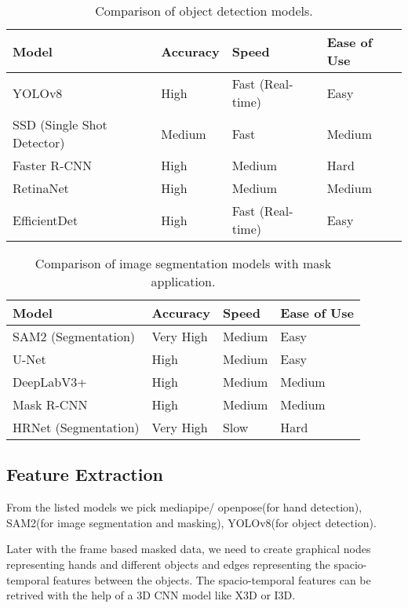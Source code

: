 \documentclass[conference]{IEEEtran}
\begin{document}
\begin{table}[h!]
    \centering
    \begin{tabular}{|l|l|l|l|}
    \hline
    \textbf{Model} & \textbf{Accuracy} & \textbf{Speed} & \textbf{Ease of Use} \\ \hline
    YOLOv8 & High & Fast (Real-time) & Easy \\ \hline
    SSD (Single Shot Detector) & Medium & Fast & Medium \\ \hline
    Faster R-CNN & High & Medium & Hard  \\ \hline
    RetinaNet & High & Medium & Medium \\ \hline
    EfficientDet & High & Fast (Real-time) & Easy\\ \hline
    \end{tabular}
    \caption{Comparison of object detection models.}
\end{table}

\begin{table}[h!]
    \centering
    \begin{tabular}{|l|l|l|l|}
    \hline
    \textbf{Model} & \textbf{Accuracy} & \textbf{Speed} & \textbf{Ease of Use} \\ \hline
    SAM2 (Segmentation) & Very High & Medium & Easy \\ \hline
    U-Net & High & Medium & Easy \\ \hline
    DeepLabV3+ & High & Medium & Medium  \\ \hline
    Mask R-CNN & High & Medium & Medium \\ \hline
    HRNet (Segmentation) & Very High & Slow & Hard \\ \hline
    \end{tabular}
    \caption{Comparison of image segmentation models with mask application.}
\end{table}

\subsection{Feature Extraction}
From the listed models we pick mediapipe/ openpose(for hand detection), SAM2(for image segmentation and masking), YOLOv8(for object detection).

Later with the frame based masked data, we need to create graphical nodes representing hands and different objects and edges representing the spacio-temporal features between the objects. The spacio-temporal features can be retrived with the help of a 3D CNN model like X3D or I3D.
\end{document}
